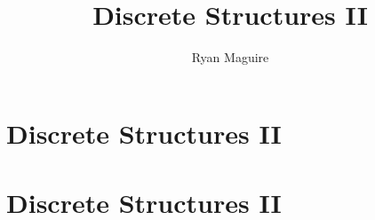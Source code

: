 \documentclass[crop=false,class=book,oneside]{standalone}
\begin{document}
    \ifx\ifmathcourses\undefined
        \title{Discrete Structures II}
        \author{Ryan Maguire}
        \date{\vspace{-5ex}}
        \maketitle
        \tableofcontents
        \chapter*{Discrete Structures II}
        \setcounter{chapter}{1}
    \else
        \chapter{Discrete Structures II}
    \fi
\end{document}
